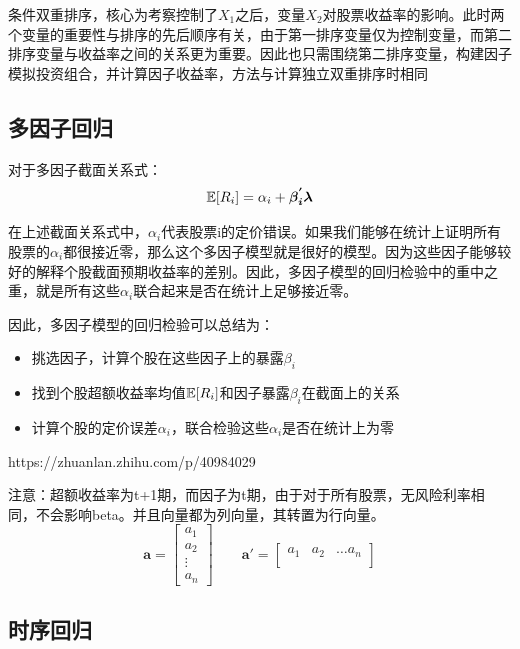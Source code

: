 \documentclass[11pt]{article}
\begin{document}
条件双重排序，核心为考察控制了$X_1$之后，变量$X_2$对股票收益率的影响。此时两个变量的重要性与排序的先后顺序有关，由于第一排序变量仅为控制变量，而第二排序变量与收益率之间的关系更为重要。因此也只需围绕第二排序变量，构建因子模拟投资组合，并计算因子收益率，方法与计算独立双重排序时相同

\subsection{多因子回归}

对于多因子截面关系式：
\begin{equation*}
    \mathbb{E}[R_i] = \alpha_i + \bm{\beta_{i}^{'} \lambda}
\end{equation*}

在上述截面关系式中，$\alpha_i$代表股票i的定价错误。如果我们能够在统计上证明所有股票的$\alpha_i$都很接近零，那么这个多因子模型就是很好的模型。因为这些因子能够较好的解释个股截面预期收益率的差别。因此，多因子模型的回归检验中的重中之重，就是所有这些$\alpha_i$联合起来是否在统计上足够接近零。

因此，多因子模型的回归检验可以总结为：
\begin{itemize}
    \item 挑选因子，计算个股在这些因子上的暴露$\beta_i$
    \item 找到个股超额收益率均值$\mathbb{E}[R_i]$和因子暴露$\beta_i$在截面上的关系
    \item 计算个股的定价误差$\alpha_i$，联合检验这些$\alpha_i$是否在统计上为零
\end{itemize}

https://zhuanlan.zhihu.com/p/40984029

注意：超额收益率为t+1期，而因子为t期，由于对于所有股票，无风险利率相同，不会影响beta。并且向量都为列向量，其转置为行向量。
\begin{equation*}
    \bm{a} = \begin{bmatrix}
        a_1 \\
        a_2 \\
        \vdots \\
        a_n
    \end{bmatrix}
    \qquad
    \bm{a}' = \begin{bmatrix}
        a_1 & a_2 & \dots a_n \\
    \end{bmatrix}
\end{equation*}

\subsection{时序回归}
\end{document}
